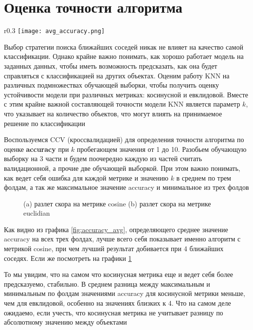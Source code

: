 \documentclass{article}
\begin{document}
\section{Оценка точности алгоритма}

    \begin{wrapfigure}{r}{0.3\textwidth}
        \texttt{[image: avg\_accuracy.png]}
        \caption{Средняя по фолдам accuracy}
        \label{fig:accuracy_avg}
    \end{wrapfigure}
    
    Выбор стратегии поиска ближайших соседей никак не влияет на качество самой классификации. Однако крайне важно понимать, как хорошо работает модель на заданных данных, чтобы иметь возможность предсказать, как она будет справляться с классификацией на других объектах. Оценим работу KNN на различных подмножествах обучающей выборки, чтобы получить оценку устойчивости модели при различных метриках: косинусной и евклидовой. Вместе с этим крайне важной составляющей точности модели KNN является параметр $k$, что указывает на количество объектов, что могут влиять на принимаемое решение по классификации
    

    Воспользуемся CCV (кроссвалидацией) для определения точности алгоритма по оценке \textbf{accuracy} при $k$ пробегающем значения от 1 до 10. Разобьем обучающую выборку на 3 части и будем поочередно каждую из частей считать валидационной, а прочие две обучающей выборкой. При этом важно понимать, как ведет себя ошибка для каждой метрике и значению $k$ в среднем по трем фолдам, а так же максимальное значение accuracy и минимальное из трех фолдов
    
    \begin{figure}[h]
        \centering
        \label{fig:accuracy_on_folds}
        \caption{(a) разлет скора на метрике cosine (b) разлет скора на метрике euclidian}
    \end{figure}

    Как видно из графика \ref{fig:accuracy_avg}, определяющего среднее значение accuracy на всех трех фолдах, лучше всего себя показывает именно алгоритм с метрикой cosine, при чем лучший результат добивается при 4 ближайших соседях. Если же посмотреть на графики \ref{fig:accuracy_on_folds}
    

    То мы увидим, что на самом что косинусная метрика еще и ведет себя более предсказуемо, стабильно. В среднем разница между максимальным и минимальным по фолдам значениями accuracy для косинусной метрики меньше, чем для евклидовой, особенно на значениях близких к 4. Что на самом деле ожидаемо, если учесть, что косинусная метрика не учитывает разницу по абсолютному значению между объектами\\
\end{document}
